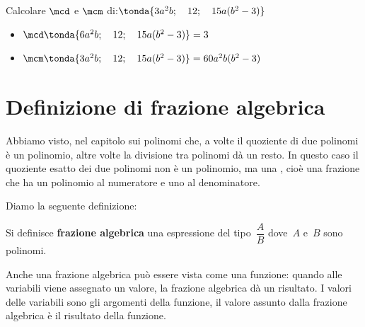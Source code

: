 \begin{esempio}{}{}
Calcolare \(\mcd\) e \(\mcm\) di:\quad \(\tonda{3a^2b;\quad 12;\quad 
15a(b^2-3)}\)
\begin{itemize}[nosep]
\item \(\mcd \tonda{6a^2b;\quad 12;\quad 15a(b^2-3)}=3\)
\item \(\mcm \tonda{3a^2b;\quad 12;\quad 15a(b^2-3)}=60a^2b(b^2-3)\)
\end{itemize}

\end{esempio}


\section{Definizione di frazione algebrica}
\label{sec:frazalg_definizione}

Abbiamo visto, nel capitolo sui polinomi che, a volte il quoziente di 
due polinomi è un polinomio, altre volte la divisione tra polinomi dà 
un resto.
In questo caso il quoziente esatto dei due polinomi non è un polinomio, 
ma una , cioè una frazione che ha un polinomio 
al numeratore e uno al denominatore.

% 

Diamo la seguente definizione:
\begin{definizione}{}{}
Si definisce \textbf{frazione algebrica} una espressione del
tipo~\(\dfrac{A}{B}\) dove~\(A\) e~\(B\) sono polinomi.
\end{definizione}

Anche una frazione algebrica può essere vista come una funzione: quando 
alle variabili viene assegnato un valore, la frazione algebrica dà un 
risultato.
I valori delle variabili sono gli argomenti della funzione, il valore 
assunto dalla frazione algebrica è il risultato della funzione.


